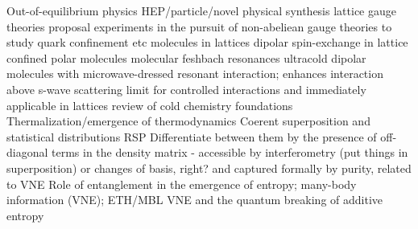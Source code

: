 		\cite{clark16}%
		\cite{goldman16}%
		\cite{nakagawa14}%
Out-of-equilibrium physics
		\cite{eisert15}%
	HEP/particle/novel physical synthesis
		\cite{keilmann11}%
		lattice gauge theories
			proposal
				\cite{zohar16}%
			experiments
				\cite{schweizer19}%
		in the pursuit of non-abeliean gauge theories to study quark confinement etc
			\cite{tagliacozzo13}%
molecules in lattices
		\cite{yan13} dipolar spin-exchange in lattice confined polar molecules
		\cite{yang19} molecular feshbach resonances
		\cite{yan20} ultracold dipolar molecules with microwave-dressed resonant interaction; enhances interaction above s-wave scattering limit for controlled interactions and immediately applicable in lattices
		\cite{balakrishnan16} review of cold chemistry 
		\cite{yelin06, micheli06} %
foundations
	Thermalization/emergence of thermodynamics
		\cite{anderson58}%
		\cite{dalessio16}%
		\cite{goold16}%
		\cite{srednicki94}%
		\cite{clos16}%
		\cite{kaufman16}%
		Coerent superposition and statistical distributions RSP
			Differentiate between them by the presence of off-diagonal terms in the density matrix - accessible by interferometry (put things in superposition) or changes of basis, right? and captured formally by purity, related to VNE 
	Role of entanglement in the emergence of entropy; many-body information (VNE); ETH/MBL
		\cite{kaufman16}%
		\cite{nandkishore15}%
			VNE and the quantum breaking of additive entropy
		\cite{chiu18}%
